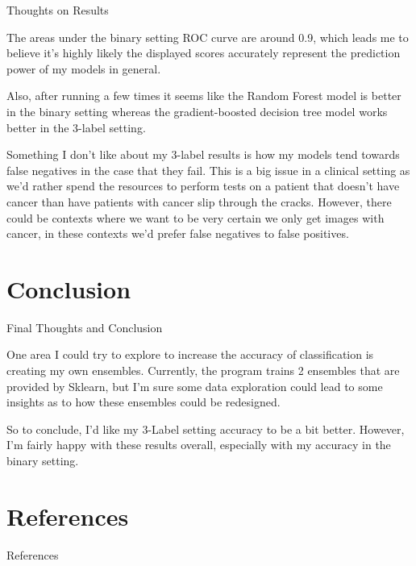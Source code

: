 \documentclass[11pt]{beamer}
\begin{document}
\begin{frame}{Thoughts on Results}
    \par The areas under the binary setting ROC curve are around 0.9, which leads me to believe it's highly likely the displayed scores accurately represent the prediction power of my models in general.
    
    \vspace{3mm}
    
    \par Also, after running a few times it seems like the Random Forest model is better in the binary setting whereas the gradient-boosted decision tree model works better in the 3-label setting.
    
    \vspace{3mm}
    
    \par Something I don't like about my 3-label results is how my models tend towards false negatives in the case that they fail. This is a big issue in a clinical setting as we'd rather spend the resources to perform tests on a patient that doesn't have cancer than have patients with cancer slip through the cracks. However, there could be contexts where we want to be very certain we only get images with cancer, in these contexts we'd prefer false negatives to false positives.
\end{frame}

\section{Conclusion}

\begin{frame}{Final Thoughts and Conclusion}
    \par One area I could try to explore to increase the accuracy of classification is creating my own ensembles. Currently, the program trains 2 ensembles that are provided by Sklearn, but I'm sure some data exploration could lead to some insights as to how these ensembles could be redesigned.

    \vspace{8mm}

    \par So to conclude, I'd like my 3-Label setting accuracy to be a bit better. However, I'm fairly happy with these results overall, especially with my accuracy in the binary setting.
\end{frame}

\section{References}
\begin{frame}[shrink=15]{References}
    
\end{frame}
\end{document}
